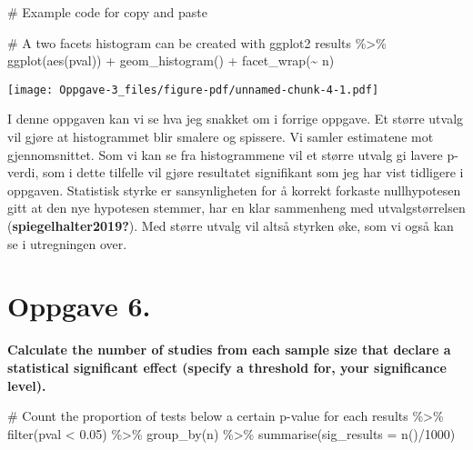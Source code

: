 \documentclass[
  letterpaper,
  DIV=11,
  numbers=noendperiod]{scrreprt}
\newenvironment{Shaded}{\begin{snugshade}}{\end{snugshade}}
\newcommand{\AttributeTok}[1]{\textcolor[rgb]{0.40,0.45,0.13}{#1}}
\newcommand{\CommentTok}[1]{\textcolor[rgb]{0.37,0.37,0.37}{#1}}
\newcommand{\DecValTok}[1]{\textcolor[rgb]{0.68,0.00,0.00}{#1}}
\newcommand{\FloatTok}[1]{\textcolor[rgb]{0.68,0.00,0.00}{#1}}
\newcommand{\FunctionTok}[1]{\textcolor[rgb]{0.28,0.35,0.67}{#1}}
\newcommand{\NormalTok}[1]{\textcolor[rgb]{0.00,0.23,0.31}{#1}}
\newcommand{\SpecialCharTok}[1]{\textcolor[rgb]{0.37,0.37,0.37}{#1}}
\begin{document}
\begin{Shaded}
\begin{Highlighting}[]
\CommentTok{\# Example code for copy and paste}

\CommentTok{\# A two facets histogram can be created with ggplot2}
\NormalTok{results }\SpecialCharTok{\%\textgreater{}\%}
  \FunctionTok{ggplot}\NormalTok{(}\FunctionTok{aes}\NormalTok{(pval)) }\SpecialCharTok{+} 
  \FunctionTok{geom\_histogram}\NormalTok{() }\SpecialCharTok{+}
  \FunctionTok{facet\_wrap}\NormalTok{(}\SpecialCharTok{\textasciitilde{}}\NormalTok{ n)}
\end{Highlighting}
\end{Shaded}

\texttt{[image: Oppgave-3\_files/figure-pdf/unnamed-chunk-4-1.pdf]}

I denne oppgaven kan vi se hva jeg snakket om i forrige oppgave. Et
større utvalg vil gjøre at histogrammet blir smalere og spissere. Vi
samler estimatene mot gjennomsnittet. Som vi kan se fra histogrammene
vil et større utvalg gi lavere p-verdi, som i dette tilfelle vil gjøre
resultatet signifikant som jeg har vist tidligere i oppgaven. Statistisk
styrke er sansynligheten for å korrekt forkaste nullhypotesen gitt at
den nye hypotesen stemmer, har en klar sammenheng med utvalgstørrelsen
(\textbf{spiegelhalter2019?}). Med større utvalg vil altså styrken øke,
som vi også kan se i utregningen over.

\section{Oppgave 6.}\label{oppgave-6.}

\textbf{Calculate the number of studies from each sample size that
declare a statistical significant effect (specify a threshold for, your
significance level).}

\begin{Shaded}
\begin{Highlighting}[]
\CommentTok{\# Count the proportion of tests below a certain p{-}value for each }
\NormalTok{results }\SpecialCharTok{\%\textgreater{}\%}
  \FunctionTok{filter}\NormalTok{(pval }\SpecialCharTok{\textless{}} \FloatTok{0.05}\NormalTok{) }\SpecialCharTok{\%\textgreater{}\%}
  \FunctionTok{group\_by}\NormalTok{(n) }\SpecialCharTok{\%\textgreater{}\%}
  \FunctionTok{summarise}\NormalTok{(}\AttributeTok{sig\_results =} \FunctionTok{n}\NormalTok{()}\SpecialCharTok{/}\DecValTok{1000}\NormalTok{)}
\end{Highlighting}
\end{Shaded}
\end{document}
